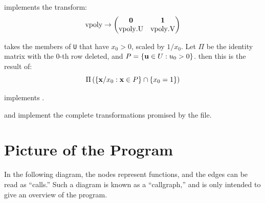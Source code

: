  implements the  transform:
\[ \mli{vpoly} \to
	\begin{pmatrix}
		\0 & \vec{1} \\ \mli{vpoly.U} & \mli{vpoly.V}
	\end{pmatrix} \]
\lstvpolytovcone

 takes the members of \texttt{U} that have $x_0 > 0$, scaled by $1/x_0$.  Let $\Pi$ be the identity matrix with the $0$-th row deleted, and $P = \left\{\mathbf{u} \in U : u_0 > 0\right\}$. then this is the result of:
\[ \Pi\left(\left\{\mathbf{x}/x_0 : \mathbf{x}\in P\right\} \cap \left\{x_0 = 1\right\}\right) \]
\lstnormalizedP

 implements .
\lstvconetovpoly

 and  implement the complete transformations promised by the file.
\lsthpolytovpoly
\lstvpolytohpoly

\section{Picture of the Program}
In the following diagram, the nodes represent functions, and the edges can be read as ``calls.''  Such a diagram is known as a ``callgraph,'' and is only intended to give an overview of the program.

